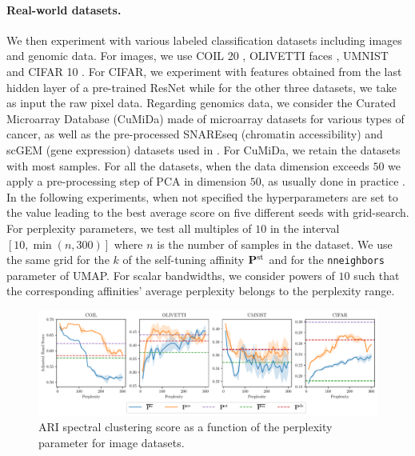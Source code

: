 \paragraph{Real-world datasets.} We then experiment with various labeled
classification datasets including images and genomic data. For images, we use
COIL 20 \cite{nene1996columbia}, OLIVETTI faces \cite{olivetti}, UMNIST
\cite{graham1998characterising} and CIFAR 10 \cite{krizhevsky2009learning}. For
CIFAR, we experiment with features obtained from the last hidden layer of a
pre-trained ResNet \cite{huyresnet} while for the other three datasets, we take
as input the raw pixel data. Regarding genomics data, we consider the Curated
Microarray Database (CuMiDa) \cite{Feltes2019} made of microarray datasets for
various types of cancer, as well as the pre-processed SNAREseq (chromatin
accessibility) and scGEM (gene expression) datasets used in
\cite{SCOT2020}. For CuMiDa, we retain the datasets with most samples. For all
the datasets, when the data dimension exceeds $50$ we apply a pre-processing
step of PCA in dimension $50$, as usually done in practice
\cite{van2008visualizing}. In the following experiments, when not specified the
hyperparameters are set to the value leading to the best average score on five
different seeds with grid-search. For perplexity parameters, we test all
multiples of $10$ in the interval $[10,\min(n,300)]$ where $n$ is the number of
samples in the dataset. We use the same grid for the $k$ of the self-tuning
affinity $\mathbf{P}^{\mathrm{st}}$ \cite{zelnik2004self} and for the
\texttt{n\textunderscore neighbors} parameter of UMAP. For scalar bandwidths, we
consider powers of $10$ such that the corresponding affinities' average perplexity belongs to the perplexity range. 

\begin{figure}[t]
    \begin{center}
    \centerline{\includegraphics[width=\columnwidth]{figures/SNEkhorn/spectral_clustering_sensitivity.pdf}}
    \caption{ARI spectral clustering score as a function of the perplexity parameter for image datasets.}
    \label{fig:spectral_clustering_sensibility}
    \end{center}
    \vspace{-1.1cm}
\end{figure}

